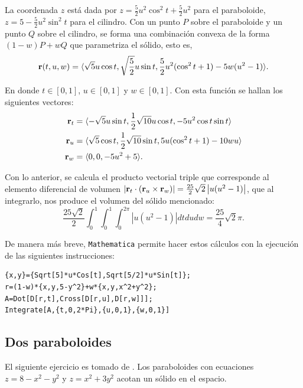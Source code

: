La coordenada $z$ está dada por {\small $z = \frac{5}{2}u^2\cos ^2t+\frac{5}{2}u^2$} para el paraboloide, {\small $z=5-\frac{5}{2}u^2\sin ^2t$} para el cilindro. Con un punto $P$ sobre el paraboloide y un punto $Q$ sobre el cilindro, se forma una combinación convexa de la forma $(1-w)P+wQ$ que parametriza el sólido, esto es,
\[{\bf r}(t,u,w)= \langle \sqrt{5}u\cos t,\sqrt{\frac{5}{2}}u\sin t,\frac{5}{2}u^2( \cos ^2t+1) -5w(u^2-1)\rangle.\]

En donde $t \in [0,1]$, $u \in [0,1]$ y $w \in [0,1]$. Con esta función se hallan los siguientes vectores:
\begin{align*}
{\bf r}_{t} & = \langle -\sqrt{5}u\sin t,\frac{1}{2}\sqrt{10}u\cos t,-5u^2\cos t\sin t\rangle \\
{\bf r}_{u} &= \langle \sqrt{5}\cos t,\frac{1}{2}\sqrt{10}\sin t,5u(\cos^2t+1)-10wu\rangle \\
{\bf r}_{w} &= \langle0,0,-5u^2+5\rangle.
\end{align*}

Con lo anterior, se calcula el producto vectorial triple que corresponde al elemento diferencial de volumen $| {\bf r}_{t}\cdot ( {\bf r}_{u}\times {\bf r}_{w}) | =\frac{25}{2}\sqrt{2} \left| u( u^2-1)\right|$, que al integrarlo, nos produce el volumen del sólido mencionado:
\[\frac{25\sqrt{2}}{2} \int_{0}^{1}\int_{0}^{1}\int_{0}^{2\pi } | u(u^2-1) | dtdudw= \frac{25}{4}\sqrt{2}\pi.\]

De manera más breve, \verb"Mathematica" permite hacer estos cálculos con la ejecución de las siguientes instrucciones:

\begin{tcolorbox}[title=\bf Instrucción en \verb"Mathematica"]\begin{Verbatim}[formatcom=\letraverbatim]
{x,y}={Sqrt[5]*u*Cos[t],Sqrt[5/2]*u*Sin[t]};
r=(1-w)*{x,y,5-y^2}+w*{x,y,x^2+y^2};
A=Dot[D[r,t],Cross[D[r,u],D[r,w]]];
Integrate[A,{t,0,2*Pi},{u,0,1},{w,0,1}]
\end{Verbatim}
\end{tcolorbox}

\subsection{Dos paraboloides} 
El siguiente ejercicio es tomado de \textcite{thomas_calculo_2015}.
Los paraboloides con ecuaciones $z=8-x^2 -y^2 $ y $z=x^2 +3y^2$ acotan un sólido en el espacio.

